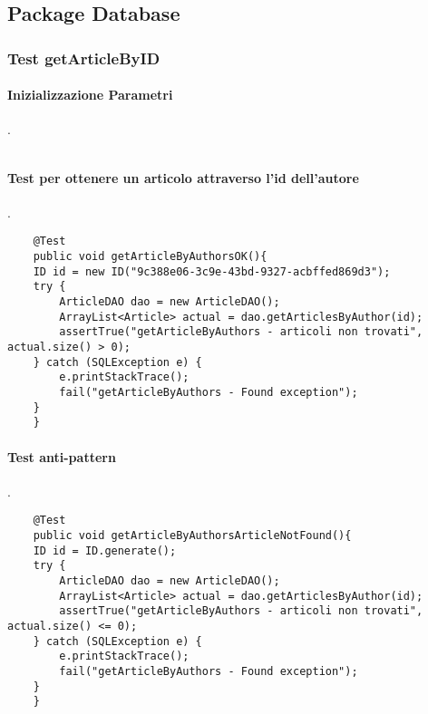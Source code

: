 \subsection{Package Database}
\label{sec:test_unita_package_database}

\subsubsection{Test getArticleByID}
\paragraph{Inizializzazione Parametri}
.
\begin{lstlisting}  
\end{lstlisting}
\paragraph{Test per ottenere un articolo attraverso l'id dell'autore  }
.
\begin{lstlisting}
    @Test
    public void getArticleByAuthorsOK(){
	ID id = new ID("9c388e06-3c9e-43bd-9327-acbffed869d3");
	try {
	    ArticleDAO dao = new ArticleDAO();
	    ArrayList<Article> actual = dao.getArticlesByAuthor(id);
	    assertTrue("getArticleByAuthors - articoli non trovati", actual.size() > 0);
	} catch (SQLException e) {
	    e.printStackTrace();
	    fail("getArticleByAuthors - Found exception");
	}
    }
\end{lstlisting}
\paragraph{Test anti-pattern }
.
\begin{lstlisting}
	@Test
    public void getArticleByAuthorsArticleNotFound(){
	ID id = ID.generate();
	try {
	    ArticleDAO dao = new ArticleDAO();
	    ArrayList<Article> actual = dao.getArticlesByAuthor(id);
	    assertTrue("getArticleByAuthors - articoli non trovati", actual.size() <= 0);
	} catch (SQLException e) {
	    e.printStackTrace();
	    fail("getArticleByAuthors - Found exception");
	}
    }
\end{lstlisting}
